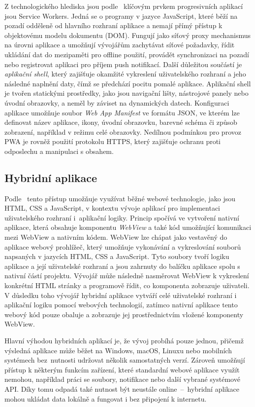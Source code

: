 Z technologického hlediska jsou podle~\cite{Pwa, Pwa_webdev} klíčovým prvkem progresivních aplikací jsou Service Workers. Jedná se o programy v jazyce JavaScript, které běží na pozadí odděleně od hlavního rozhraní aplikace a nemají přímý přístup k objektovému modelu dokumentu (DOM). Fungují jako síťový proxy mechanismus na úrovni aplikace a umožňují vývojářům zachytávat síťové požadavky, řídit ukládání dat do mezipaměti pro offline použití, provádět synchronizaci na pozadí nebo registrovat aplikaci pro příjem push notifikací. Další důležitou součástí je \textit{aplikační shell}, který zajišťuje okamžité vykreslení uživatelského rozhraní a jeho následné naplnění daty, čímž se předchází pocitu pomalé aplikace. Aplikační shell je tvořen statickými prostředky, jako jsou navigační lišty, nástrojové panely nebo úvodní obrazovky, a neměl by záviset na dynamických datech. Konfiguraci aplikace umožňuje soubor \textit{Web App Manifest} ve formátu JSON, ve kterém lze definovat název aplikace, ikony, úvodní obrazovku, barevné schéma či způsob zobrazení, například v režimu celé obrazovky. Nedílnou podmínkou pro provoz PWA je rovněž použití protokolu HTTPS, který zajišťuje ochranu proti odposlechu a manipulaci s obsahem.

\subsection{Hybridní aplikace}
\label{Hybrid}
Podle~\cite{CrossPlatformSurvey} tento přístup umožňuje využívat běžné webové technologie, jako jsou HTML, CSS a JavaScript, v kontextu vývoje aplikací pro implementaci uživatelského rozhraní i~aplikační logiky. Princip spočívá ve vytvoření nativní aplikace, která obsahuje komponentu \textit{WebView} a také kód umožňující komunikaci mezi WebView a nativním kódem. WebView lze chápat jako vestavěný do aplikace webový prohlížeč, který umožňuje vykonávání a vykreslování souborů napsaných v jazycích HTML, CSS a JavaScript. Tyto soubory tvoří logiku aplikace a její uživatelské rozhraní a jsou zahrnuty do balíčku aplikace spolu s nativní částí projektu. Vývojář může následně nasměrovat WebView k vykreslení konkrétní HTML stránky a programově řídit, co komponenta zobrazuje uživateli. V důsledku toho vývojář hybridní aplikace vytváří celé uživatelské rozhraní i aplikační logiku pomocí webových technologií, zatímco nativní aplikace tento webový kód pouze obaluje a zobrazuje jej prostřednictvím vložené komponenty WebView.

Hlavní výhodou hybridních aplikací je, že vývoj probíhá pouze jednou, přičemž výsledná aplikace může běžet na Windows, macOS, Linuxu nebo mobilních systémech bez~nutnosti udržovat několik samostatných verzí. Zároveň umožňují přístup k některým funkcím zařízení, které standardní webové aplikace využít nemohou, například práci se soubory, notifikace nebo další vybrané systémové API. Díky tomu odpadá také nutnost být neustále online~--~hybridní aplikace mohou ukládat data lokálně a fungovat i bez připojení k internetu.

